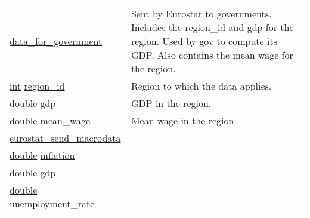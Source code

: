 \documentclass[a4paper,11pt]{article}
\begin{document}
\begin{landscape}
\begin{longtable}[H!]{ll}
\midrule
\url{data_for_government} & \parbox{10cm}{Sent by Eurostat to governments. Includes the region\_id and gdp for the region. Used by gov to compute its GDP. Also contains the mean wage for the region.}\\
    \url{int} \url{region_id} & \parbox{10cm}{Region to which the data applies.}\\
    \url{double} \url{gdp} & \parbox{10cm}{GDP in the region.}\\
    \url{double} \url{mean_wage} & \parbox{10cm}{Mean wage in the region.}\\
\midrule
\url{eurostat_send_macrodata} & \parbox{10cm}{}\\
    \url{double} \url{inflation} & \parbox{10cm}{}\\
    \url{double} \url{gdp} & \parbox{10cm}{}\\
    \url{double} \url{unemployment_rate} & \parbox{10cm}{}\\
\end{longtable}
\end{landscape}
\end{document}
